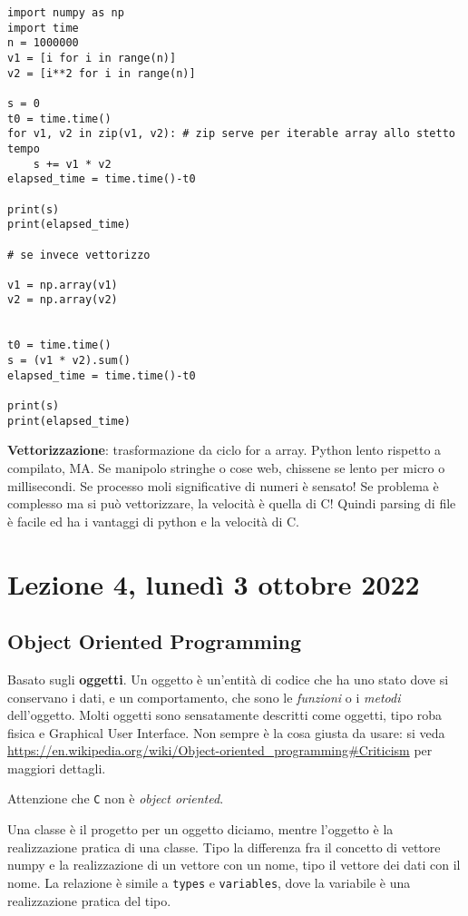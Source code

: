 \documentclass[10pt, a4paper, titlepage]{book}
\begin{document}
\begin{verbatim}
import numpy as np
import time
n = 1000000
v1 = [i for i in range(n)]
v2 = [i**2 for i in range(n)]

s = 0
t0 = time.time()
for v1, v2 in zip(v1, v2): # zip serve per iterable array allo stetto tempo
	s += v1 * v2
elapsed_time = time.time()-t0

print(s)
print(elapsed_time)

# se invece vettorizzo

v1 = np.array(v1)
v2 = np.array(v2)


t0 = time.time()
s = (v1 * v2).sum()
elapsed_time = time.time()-t0

print(s)
print(elapsed_time)
\end{verbatim}

\textbf{Vettorizzazione}: trasformazione da ciclo for a array. Python lento rispetto a compilato, MA. Se manipolo stringhe o cose web, chissene se lento per micro o millisecondi. Se processo moli significative di numeri è sensato!
Se problema è complesso ma si può vettorizzare, la velocità è quella di C! Quindi parsing di file è facile ed ha i vantaggi di python e la velocità di C.


\section{Lezione 4, lunedì 3 ottobre 2022}

\subsection{Object Oriented Programming}

Basato sugli \textbf{oggetti}. Un oggetto è un'entità di codice che ha uno stato dove si conservano i dati, e un comportamento, che sono le \textit{funzioni} o i \textit{metodi} dell'oggetto. 
Molti oggetti sono sensatamente descritti come oggetti, tipo roba fisica e Graphical User Interface. Non sempre è la cosa giusta da usare: si veda
\url{https://en.wikipedia.org/wiki/Object-oriented_programming#Criticism} per maggiori dettagli.

Attenzione che \texttt{C} non è \textit{object oriented}.

Una classe è il progetto per un oggetto diciamo, mentre l'oggetto è la realizzazione pratica di una classe. Tipo la differenza fra il concetto di vettore numpy e la realizzazione di un vettore con un nome, tipo il vettore dei dati con il nome.
La relazione è simile a \texttt{types} e \texttt{variables}, dove la variabile è una realizzazione pratica del tipo.
\end{document}
